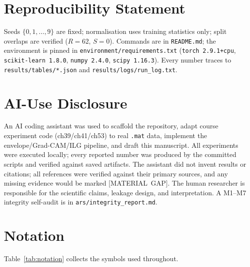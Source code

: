 \documentclass[11pt]{article}
\begin{document}
\section*{Reproducibility Statement}
Seeds $\{0,1,\dots,9\}$ are fixed; normalisation uses training statistics only; split overlaps
are verified ($R{=}62$, $S{=}0$). Commands are in \texttt{README.md}; the environment is
pinned in \texttt{environment/requirements.txt} (\texttt{torch 2.9.1+cpu},
\texttt{scikit-learn 1.8.0}, \texttt{numpy 2.4.0}, \texttt{scipy 1.16.3}). Every number
traces to \texttt{results/tables/*.json} and \texttt{results/logs/run\_log.txt}.

\section*{AI-Use Disclosure}
An AI coding assistant was used to scaffold the repository, adapt course experiment code
(ch39/ch41/ch53) to real \texttt{.mat} data, implement the envelope/Grad-CAM/ILG pipeline,
and draft this manuscript. All experiments were executed locally; every reported number
was produced by the committed scripts and verified against saved artifacts. The assistant
did not invent results or citations; all references were verified against their primary
sources, and any missing evidence would be marked \mbox{[MATERIAL GAP]}. The
human researcher is responsible for the scientific claims, leakage design, and
interpretation. A M1--M7 integrity self-audit is in \texttt{ars/integrity\_report.md}.

\appendix

\section{Notation}
\label{app:notation}
Table~\ref{tab:notation} collects the symbols used throughout.
\end{document}
